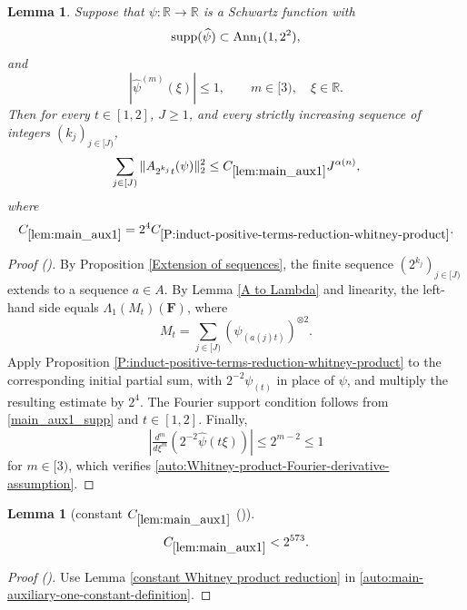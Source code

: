 \documentclass[12pt,reqno]{amsart}
\newcommand{\auto}{{({\tiny\faCar})}}
\theoremstyle{plain}
\newtheorem{lemma}[theorem]{Lemma}
\numberwithin{equation}{section}
\theoremstyle{remark}
\newcommand{\uses}[1]{}
\newcommand{\usesdefs}[1]{}
\newcommand{\R}{{\mathbb R}}
\newcommand{\F}{\mathbf{F}}
\begin{document}
\begin{lemma}\label{lem:main_aux1}\uses{Extension of sequences,A to Lambda,P:induct-positive-terms-reduction-whitney-product}\usesdefs{A_def,normalized function tuples,auto:prism-form-definition,multiplicatively spaced monotone sequences}
Suppose that $\psi:\R\to\R$ is a Schwartz function with
\begin{equation}\label{main_aux1_supp}
{\rm supp}(\widehat\psi)\subset\mathrm{Ann}_1(1,2^2),
\end{equation}
and
\begin{equation}\label{auto:main-auxiliary-one-Fourier-derivative-assumption}
|\widehat\psi^{(m)}(\xi)|\le1,
\qquad
m\in[3),
\quad
\xi\in\R.
\end{equation}
Then for every $t\in[1,2]$, $J\ge1$, and every strictly increasing sequence of integers $(k_j)_{j\in[J)}$,
\begin{equation}\label{main_aux1}
\sum_{j\in[J)}\|A_{2^{k_j}t}(\psi)\|_2^2
\le C_{\ref{lem:main_aux1}}J^{\alpha(n)},
\end{equation}
where
\begin{equation}\label{auto:main-auxiliary-one-constant-definition}
C_{\ref{lem:main_aux1}}
=2^4C_{\ref{P:induct-positive-terms-reduction-whitney-product}}.
\end{equation}
\end{lemma}

\begin{proof}[Proof \auto]
By Proposition \ref{Extension of sequences}, the finite sequence $(2^{k_j})_{j\in[J)}$ extends to a sequence $a\in A$. By Lemma \ref{A to Lambda} and linearity, the left-hand side equals $\Lambda_1(M_t)(\F)$, where
\[
M_t=\sum_{j\in[J)}(\psi_{(a(j)t)})^{\otimes2}.
\]
Apply Proposition \ref{P:induct-positive-terms-reduction-whitney-product} to the corresponding initial partial sum, with $2^{-2}\psi_{(t)}$ in place of $\psi$, and multiply the resulting estimate by $2^4$. The Fourier support condition follows from \eqref{main_aux1_supp} and $t\in[1,2]$. Finally,
\[
\left|\tfrac{d^m}{d\xi^m}
\left(2^{-2}\widehat\psi(t\xi)\right)\right|
\le2^{m-2}\le1
\]
for $m\in[3)$, which verifies \eqref{auto:Whitney-product-Fourier-derivative-assumption}.
\end{proof}

\begin{lemma}[constant $C_{\ref{lem:main_aux1}}$ \auto]\label{constant main auxiliary one}\uses{constant Whitney product reduction,lem:main_aux1}\usesdefs{}
\begin{equation}\label{constant main auxiliary one bound}
C_{\ref{lem:main_aux1}}<2^{573}.
\end{equation}
\end{lemma}
\begin{proof}[Proof \auto]
Use Lemma \ref{constant Whitney product reduction} in \eqref{auto:main-auxiliary-one-constant-definition}.
\end{proof}
\end{document}

